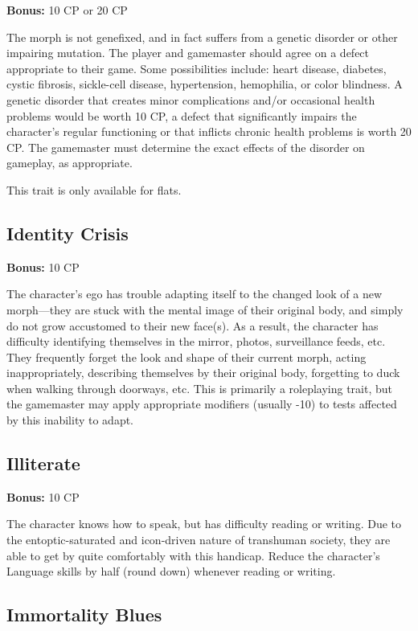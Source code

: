 \textbf{Bonus:} 10 CP or 20 CP

The morph is not genefixed, and in fact suffers from a genetic disorder or other impairing mutation. The player and gamemaster should agree on a defect appropriate to their game. Some possibilities include: heart disease, diabetes, cystic fibrosis, sickle-cell disease, hypertension, hemophilia, or color blindness. A genetic disorder that creates minor complications and/or occasional health problems would be worth 10 CP, a defect that significantly impairs the character’s regular functioning or that inflicts chronic health problems is worth 20 CP. The gamemaster must determine the exact effects of the disorder on gameplay, as appropriate.

This trait is only available for flats.

\subsection{Identity Crisis}
\label{sec:traits-identity-crisis}

\textbf{Bonus:} 10 CP

The character’s ego has trouble adapting itself to the changed look of a new morph—they are stuck with the mental image of their original body, and simply do not grow accustomed to their new face(s). As a result, the character has difficulty identifying themselves in the mirror, photos, surveillance feeds, etc. They frequently forget the look and shape of their current morph, acting inappropriately, describing themselves by their original body, forgetting to duck when walking through doorways, etc. This is primarily a roleplaying trait, but the gamemaster may apply appropriate modifiers (usually -10) to tests affected by this inability to adapt.

\subsection{Illiterate}
\label{sec:traits-illiterate}

\textbf{Bonus:} 10 CP

The character knows how to speak, but has difficulty reading or writing. Due to the entoptic-saturated and icon-driven nature of transhuman society, they are able to get by quite comfortably with this handicap. Reduce the character’s Language skills by half (round down) whenever reading or writing.

\subsection{Immortality Blues}
\label{sec:traits-immortality-blues}

